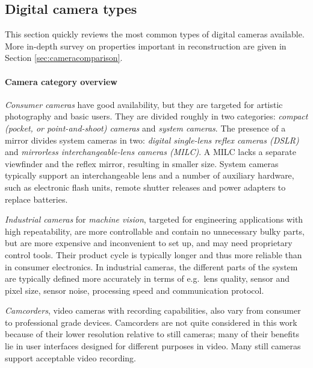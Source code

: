 \subsection{Digital camera types} \label{sec:cameratypes} %


This section quickly reviews the most common types of digital cameras available.
More in-depth survey on properties important in reconstruction are given in Section \ref{sec:cameracomparison}.
%

\paragraph{Camera category overview}
\emph{Consumer cameras} have good availability, but they are targeted for artistic photography and basic users.
They are divided roughly in two categories: \emph{compact (pocket, or point-and-shoot) cameras} and \emph{system cameras}.
The presence of a mirror divides system cameras in two: \emph{digital single-lens reflex cameras (DSLR)} and \emph{mirrorless interchangeable-lens cameras (MILC)}.
A MILC lacks a separate viewfinder and the reflex mirror, resulting in smaller size.
System cameras typically support an interchangeable lens and a number of auxiliary hardware, such as electronic flash units, remote shutter releases and power adapters to replace batteries.

\emph{Industrial cameras} for \emph{machine vision}, targeted for engineering applications with high repeatability, are more controllable and contain no unnecessary bulky parts, but are more expensive and inconvenient to set up, and may need proprietary control tools.
Their product cycle is typically longer and thus more reliable than in consumer electronics.
In industrial cameras, the different parts of the system are typically defined more accurately in terms of e.g.\ lens quality, sensor and pixel size, sensor noise, processing speed and communication protocol.

\emph{Camcorders}, video cameras with recording capabilities, also vary from consumer to professional grade devices.
Camcorders are not quite considered in this work because of their lower resolution relative to still cameras; many of their benefits lie in user interfaces designed for different purposes in video.
Many still cameras support acceptable video recording.


